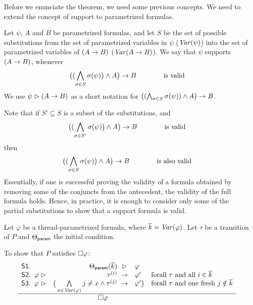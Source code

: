 Before we enunciate the theorem, we need some previous concepts.
%
We need to extend the concept of support to parametrized formulas.


\begin{defn}[Support]
  Let $\psi$, $A$ and $B$ be parametrized formulas, and let $S$ be the
  set of possible substitutions from the set of parametrized variables in $\psi$ ($\mathit{Var}(\psi)$) into the set of parametrized variables of $(A\mathrel{\rightarrow} B)$ ($\mathit{Var}(A\mathrel{\rightarrow} B)$).
%
  We say that $\psi$ supports $(A\mathrel{\rightarrow} B)$, whenever
%
  \[ \big( (\bigwedge_{\sigma\in S} \sigma(\psi)\big) \wedge A\big) \mathrel{\rightarrow} B \hspace{4em} \text{is valid} \]
%
  We use $\psi\mathrel{\rhd}(A\mathrel{\rightarrow} B)$ as a short notation for
  $\big((\bigwedge_{\sigma\in S} \sigma(\psi)) \wedge A\big) \mathrel{\rightarrow} B$.  
\end{defn}

Note that if $S'\subseteq S$ is a subset of the substitutions, and 
%
  \[ \big( (\bigwedge_{\sigma\in S'} \sigma(\psi)\big) \wedge A\big) \mathrel{\rightarrow} B \hspace{4em} \text{is valid} \]
%
then
%
  \[ \big( (\bigwedge_{\sigma\in S} \sigma(\psi)\big) \wedge A\big) \mathrel{\rightarrow} B \hspace{4em} \text{is also valid} \]
%
  Essentially, if one is successful proving the validity of a formula obtained by removing some of the conjuncts from the antecedent, the validity of the full formula holds.
%
  Hence, in practice, it is enough to consider only some of the partial substitutions to show that a support formula is valid.


\begin{itheorem}
	Let $\varphi$ be a thread-parametrized formula, where $\overline{k}=\mathit{Var}(\varphi)$. 
	Let $\tau$ be a transition of $P$ and $\Theta_{\textsf{param}}$ the initial condition.

	To show that $P$ satisfies $\square\varphi$:
	\hspace{-1em}
	\[ 
		\begin{array}{r@{\;\;}lr@{\;}@{\;}cl@{\hspace{1em}}l}
			\Premise{S1}. & & \ThetaParam(\overline{k}) &\supports & \varphi & \\

			\Premise{S2}. & \varphi \supports & \tau^{(i)} &\Into& \varphi'  & \text{forall $\tau$ and all $i\in \overline{k}$}\\
			\Premise{S3}. & \varphi\supports & \big(\bigwedge\limits_{x\in\Var(\varphi)} j\neq x \andcond \tau^{(j)} &\Into& \varphi' \big)& \text{forall $\tau$ and one fresh $j\notin\overline{k}$}\\ \hline
			& \multicolumn{4}{c}{\hspace{3em} \Always \varphi} &
		\end{array}
	\]
\label{thm:biggest}
\end{itheorem}



